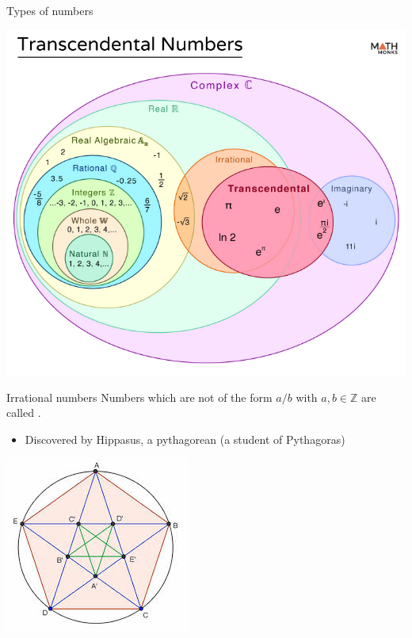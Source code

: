 \documentclass{beamer}
\begin{document}
\begin{frame}{Types of numbers}
\begin{center}
\includegraphics[width=0.8\linewidth]{fig/numbers}
\end{center}
\end{frame}

\begin{frame}{Irrational numbers}
Numbers which are not of the form $a/b$ with $a,b\in\mathbb{Z}$ are called .\\
\begin{itemize}
\item Discovered by Hippasus, a pythagorean (a student of Pythagoras)
\end{itemize}
\begin{center}
\includegraphics[width=0.4\linewidth]{fig/pentagram}
\end{center}
\end{frame}
\end{document}
